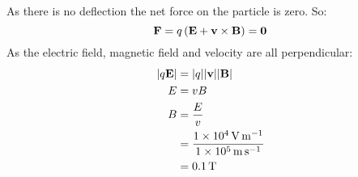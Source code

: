 As there is no deflection the net force on the particle is zero. So:
\begin{equation*}
    \mathbf{F} = q \del{\mathbf{E} + \mathbf{v} \times \mathbf{B}} = \mathbf{0}
\end{equation*}
As the electric field, magnetic field and velocity are all perpendicular:
\begin{align*}
    \abs{q \mathbf{E}} & = \abs{q} \abs{\mathbf{v}} \abs{\mathbf{B}}\\
    E & = vB\\
    B & = \frac{E}{v}\\
    & = \frac{\SI{1e4}{\volt\metre\tothe{-1}}}{\SI{1e5}{\metre\second\tothe{-1}}}\\
    & = \SI{0.1}{\tesla}
\end{align*}
